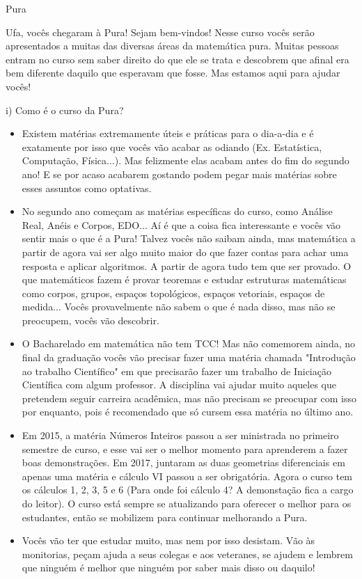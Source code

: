 \begin{subsecao}{Pura}


Ufa, vocês chegaram à Pura! Sejam bem-vindos! Nesse curso vocês serão apresentados a
muitas das diversas áreas da matemática pura. Muitas pessoas entram no curso
sem saber direito do que ele se trata e descobrem que afinal era bem diferente
daquilo que esperavam que fosse. Mas estamos aqui para ajudar vocês!

i) Como é o curso da Pura?

\begin{itemize}

\item  Existem matérias extremamente úteis e práticas para o dia-a-dia e é
exatamente por isso que vocês vão acabar as odiando (Ex. Estatística,
Computação, Física...). Mas felizmente elas acabam antes do fim do segundo ano!
E se por acaso acabarem gostando podem pegar mais matérias sobre esses assuntos
como optativas.
\item No segundo ano começam as matérias específicas do curso, como Análise Real,
Anéis e Corpos, EDO... Aí é que a coisa fica interessante e vocês vão sentir
mais o que é a Pura! Talvez vocês não saibam ainda, mas matemática a partir de
agora vai ser algo muito maior do que fazer contas para achar uma resposta e aplicar
algoritmos. A partir de agora tudo tem que ser provado. O que matemáticos
fazem é provar teoremas e estudar estruturas matemáticas como corpos, grupos,
espaços topológicos, espaços vetoriais, espaços de medida... Vocês provavelmente
não sabem o que é nada disso, mas não se preocupem, vocês vão descobrir.
\item O Bacharelado em matemática não tem TCC! Mas não comemorem ainda, no final da
graduação vocês vão precisar fazer uma matéria chamada "Introdução ao trabalho Científico"
em que precisarão fazer um trabalho de Iniciação Científica com algum professor. A
disciplina vai ajudar muito aqueles que pretendem seguir carreira acadêmica, mas não
precisam se preocupar com isso por enquanto, pois é recomendado que só cursem essa
matéria no último ano.
\item Em 2015, a matéria Números Inteiros passou a ser ministrada no primeiro
semestre de curso, e esse vai ser o melhor momento para aprenderem a fazer boas
demonstrações. Em 2017, juntaram as duas geometrias diferenciais em apenas uma
matéria e cálculo VI passou a ser obrigatória. Agora o curso tem os cálculos 1, 2, 3,
5 e 6 (Para onde foi cálculo 4? A demonstação fica a cargo do leitor).
O curso está sempre se atualizando para oferecer o melhor para os estudantes,
então se mobilizem para continuar melhorando a Pura.
\item  Vocês vão ter que estudar muito, mas nem por isso desistam. Vão às monitorias,
peçam ajuda a seus colegas e aos veteranes, se ajudem e lembrem que ninguém é melhor
que ninguém por saber mais disso ou daquilo!


\end{itemize}
\end{subsecao}
